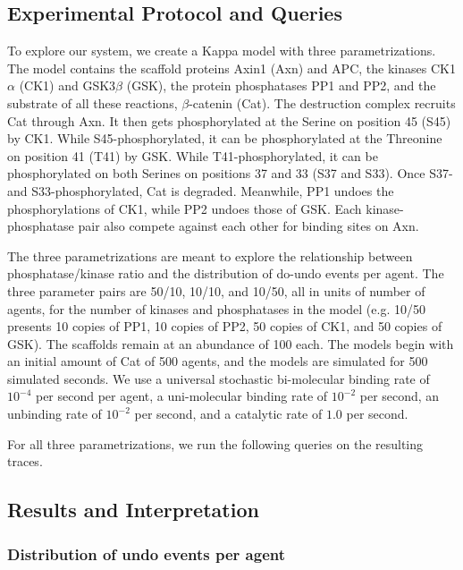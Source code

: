 \subsection{Experimental Protocol and Queries}

To explore our system, we create a Kappa model with three
parametrizations. The model contains the scaffold proteins Axin1 (Axn)
and APC, the kinases CK1$\alpha$ (CK1) and GSK3$\beta$ (GSK), the
protein phosphatases PP1 and PP2, and the substrate of all these
reactions, $\beta$-catenin (Cat). The destruction complex recruits
Cat through Axn. It then gets phosphorylated at the Serine on position
45 (S45) by CK1. While S45-phosphorylated, it can be phosphorylated at
the Threonine on position 41 (T41) by GSK. While T41-phosphorylated,
it can be phosphorylated on both Serines on positions 37 and 33 (S37 and
S33). Once S37- and S33-phosphorylated, Cat is degraded. Meanwhile, PP1
undoes the phosphorylations of CK1, while PP2 undoes those of GSK. Each
kinase-phosphatase pair also compete against each other for binding sites
on Axn.

The three parametrizations are meant to explore the relationship
between phosphatase/kinase ratio and the distribution of do-undo
events per agent. The three parameter pairs are 50/10, 10/10, and
10/50, all in units of number of agents, for the number of kinases and
phosphatases in the model (e.g. 10/50 presents 10 copies of PP1, 10
copies of PP2, 50 copies of CK1, and 50 copies of GSK). The scaffolds
remain at an abundance of 100 each. The models begin with an initial
amount of Cat of 500 agents, and the models are simulated for 500
simulated seconds. We use a universal stochastic bi-molecular binding
rate of $10^{-4}$ per second per agent, a uni-molecular binding rate
of $10^{-2}$ per second, an unbinding rate of $10^{-2}$ per second,
and a catalytic rate of $1.0$ per second.

For all three parametrizations, we run the following queries on the
resulting traces.




\subsection{Results and Interpretation}

\subsubsection*{Distribution of undo events per agent}

